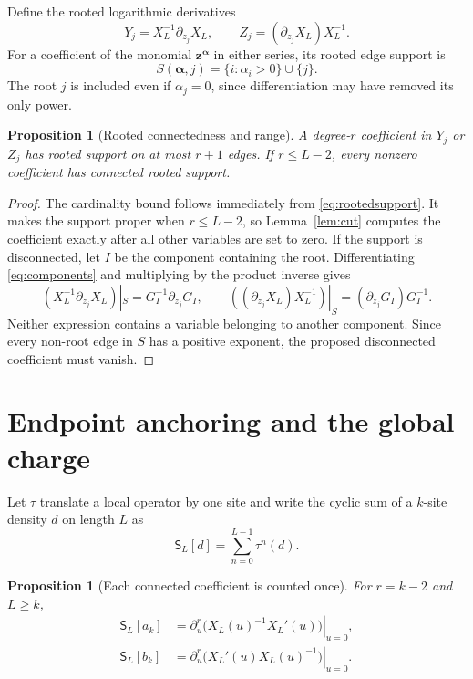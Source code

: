 \documentclass[11pt,a4paper]{article}
\newtheorem{proposition}[theorem]{Proposition}
\theoremstyle{definition}
\theoremstyle{remark}
\newcommand{\cyc}{\mathsf{S}}
\begin{document}
Define the rooted logarithmic derivatives
\begin{equation}
 Y_j=X_L^{-1}\partial_{z_j}X_L,
 \qquad Z_j=(\partial_{z_j}X_L)X_L^{-1}.
 \label{eq:YZ}
\end{equation}
For a coefficient of the monomial $\bm z^{\bm\alpha}$ in either series, its rooted
edge support is
\begin{equation}
 S(\bm\alpha,j)=\{i:\alpha_i>0\}\cup\{j\}.
 \label{eq:rootedsupport}
\end{equation}
The root $j$ is included even if $\alpha_j=0$, since differentiation may have removed
its only power.

\begin{proposition}[Rooted connectedness and range]
\label{prop:rooted}
A degree-$r$ coefficient in $Y_j$ or $Z_j$ has rooted support on at most $r+1$
edges.  If $r\leq L-2$, every nonzero coefficient has connected rooted support.
\end{proposition}

\begin{proof}
The cardinality bound follows immediately from \eqref{eq:rootedsupport}.  It makes
the support proper when $r\leq L-2$, so Lemma~\ref{lem:cut} computes the coefficient
exactly after all other variables are set to zero.  If the support is disconnected,
let $I$ be the component containing the root.  Differentiating
\eqref{eq:components} and multiplying by the product inverse gives
\begin{equation}
 (X_L^{-1}\partial_{z_j}X_L)|_S=G_I^{-1}\partial_{z_j}G_I,
 \qquad
 ((\partial_{z_j}X_L)X_L^{-1})|_S=(\partial_{z_j}G_I)G_I^{-1}.
\end{equation}
Neither expression contains a variable belonging to another component.  Since every
non-root edge in $S$ has a positive exponent, the proposed disconnected coefficient
must vanish.
\end{proof}

\section{Endpoint anchoring and the global charge}

Let $\tau$ translate a local operator by one site and write the cyclic sum of a
$k$-site density $d$ on length $L$ as
\begin{equation}
 \cyc_L[d]=\sum_{n=0}^{L-1}\tau^n(d).
\end{equation}

\begin{proposition}[Each connected coefficient is counted once]
\label{prop:anchoring}
For $r=k-2$ and $L\geq k$,
\begin{align}
 \cyc_L[a_k]&=
 \left.\partial_u^r\bigl(X_L(u)^{-1}X_L'(u)\bigr)\right|_{u=0},
 \label{eq:leftsum}\\
 \cyc_L[b_k]&=
 \left.\partial_u^r\bigl(X_L'(u)X_L(u)^{-1}\bigr)\right|_{u=0}.
 \label{eq:rightsum}
\end{align}
\end{proposition}
\end{document}
